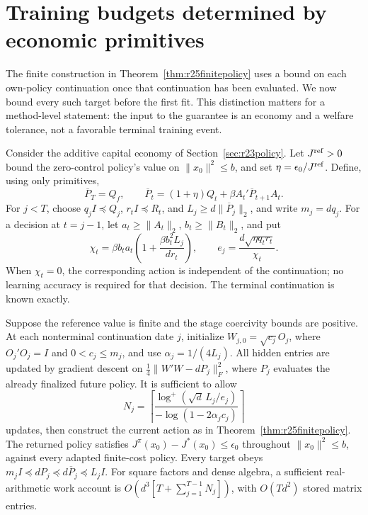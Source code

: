 \section{Training budgets determined by economic primitives}
\label{sec:r27primitive}
The finite construction in Theorem~\ref{thm:r25finitepolicy} uses a bound on each
own-policy continuation once that continuation has been evaluated. We now
bound every such target before the first fit. This distinction matters for a
method-level statement: the input to the guarantee is an economy and a welfare
tolerance, not a favorable terminal training event.

Consider the additive capital economy of Section~\ref{sec:r23policy}.
Let $J^{\rm ref}>0$ bound the zero-control policy's value on
$\|x_0\|^2\leq b$, and set $\eta=\epsilon_0/J^{\rm ref}$. Define, using only
primitives,
\begin{equation}\label{eq:r27envelope}
 \overline P_T=Q_f,\qquad
 \overline P_t=(1+\eta)Q_t+\beta A_t'\overline P_{t+1}A_t.
\end{equation}
For $j<T$, choose $q_jI\preceq Q_j$, $r_tI\preceq R_t$, and
$L_j\geq d\|\overline P_j\|_2$, and write $m_j=dq_j$.
For a decision at $t=j-1$, let $a_t\geq\|A_t\|_2$,
$b_t\geq\|B_t\|_2$, and put
\begin{equation}\label{eq:r27threshold}
 \chi_t=\beta b_ta_t\left(1+\frac{\beta b_t^2L_j}{dr_t}\right),
 \qquad e_j=\frac{d\sqrt{\eta q_tr_t}}{\chi_t}.
\end{equation}
When $\chi_t=0$, the corresponding action is independent of the continuation;
no learning accuracy is required for that decision. The terminal continuation
is known exactly.

\begin{theorem}\label{thm:r27primitive}
Suppose the reference value is finite and the stage coercivity bounds are
positive. At each nonterminal continuation date $j$, initialize
$W_{j,0}=\sqrt{c_j}O_j$, where $O_j'O_j=I$ and $0<c_j\leq m_j$, and use
$\alpha_j=1/(4L_j)$. All hidden entries are updated by gradient descent on
$\frac14\|W'W-dP_j\|_F^2$, where $P_j$ evaluates the already finalized future
policy. It is sufficient to allow
\begin{equation}\label{eq:r27cap}
 N_j=\left\lceil
 \frac{\log^+(\sqrt d\,L_j/e_j)}{-\log(1-2\alpha_jc_j)}
 \right\rceil
\end{equation}
updates, then construct the current action as in
Theorem~\ref{thm:r25finitepolicy}. The returned policy satisfies
$J^\pi(x_0)-J^*(x_0)\leq\epsilon_0$ throughout $\|x_0\|^2\leq b$,
against every adapted finite-cost policy. Every target obeys
$m_jI\preceq dP_j\preceq d\overline P_j\preceq L_jI$.
For square factors and dense algebra, a sufficient real-arithmetic work account
is $O(d^3[T+\sum_{j=1}^{T-1}N_j])$, with $O(Td^2)$ stored matrix entries.
\end{theorem}

